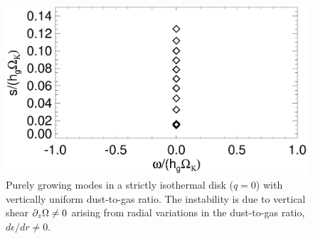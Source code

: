 \begin{figure}
  \includegraphics[width=\linewidth]{figures/vert_mixed_modes} 
  \caption{Purely growing modes in a strictly isothermal disk ($q=0$) with
    vertically uniform dust-to-gas ratio. The instability is due to 
    vertical shear $\partial_z\Omega\neq0$ arising from radial variations in
    the dust-to-gas ratio, $d\epsilon/dr\neq 0$. \label{vert_mixed_modes}
    }
\end{figure}





